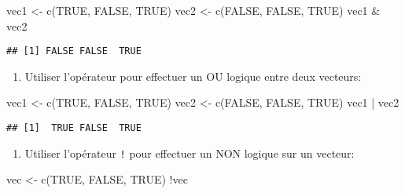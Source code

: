 \documentclass[
]{article}
\newenvironment{Shaded}{\begin{snugshade}}{\end{snugshade}}
\newcommand{\ConstantTok}[1]{\textcolor[rgb]{0.00,0.00,0.00}{#1}}
\newcommand{\FunctionTok}[1]{\textcolor[rgb]{0.00,0.00,0.00}{#1}}
\newcommand{\NormalTok}[1]{#1}
\newcommand{\OtherTok}[1]{\textcolor[rgb]{0.56,0.35,0.01}{#1}}
\newcommand{\SpecialCharTok}[1]{\textcolor[rgb]{0.00,0.00,0.00}{#1}}
\providecommand{\tightlist}{%
  \setlength{\itemsep}{0pt}\setlength{\parskip}{0pt}}
\begin{document}
\begin{Shaded}
\begin{Highlighting}[]
\NormalTok{vec1 }\OtherTok{\textless{}{-}} \FunctionTok{c}\NormalTok{(}\ConstantTok{TRUE}\NormalTok{, }\ConstantTok{FALSE}\NormalTok{, }\ConstantTok{TRUE}\NormalTok{)}
\NormalTok{vec2  }\OtherTok{\textless{}{-}} \FunctionTok{c}\NormalTok{(}\ConstantTok{FALSE}\NormalTok{, }\ConstantTok{FALSE}\NormalTok{, }\ConstantTok{TRUE}\NormalTok{)}
\NormalTok{vec1 }\SpecialCharTok{\&}\NormalTok{ vec2}
\end{Highlighting}
\end{Shaded}

\begin{verbatim}
## [1] FALSE FALSE  TRUE
\end{verbatim}

\begin{enumerate}
\def\labelenumi{\arabic{enumi}.}
\setcounter{enumi}{4}
\tightlist
\item
  Utiliser l'opérateur \texttt{\textbar{}} pour effectuer un OU logique entre deux vecteurs:
\end{enumerate}

\begin{Shaded}
\begin{Highlighting}[]
\NormalTok{vec1 }\OtherTok{\textless{}{-}} \FunctionTok{c}\NormalTok{(}\ConstantTok{TRUE}\NormalTok{, }\ConstantTok{FALSE}\NormalTok{, }\ConstantTok{TRUE}\NormalTok{)}
\NormalTok{vec2  }\OtherTok{\textless{}{-}} \FunctionTok{c}\NormalTok{(}\ConstantTok{FALSE}\NormalTok{, }\ConstantTok{FALSE}\NormalTok{, }\ConstantTok{TRUE}\NormalTok{)}
\NormalTok{vec1 }\SpecialCharTok{|}\NormalTok{ vec2}
\end{Highlighting}
\end{Shaded}

\begin{verbatim}
## [1]  TRUE FALSE  TRUE
\end{verbatim}

\begin{enumerate}
\def\labelenumi{\arabic{enumi}.}
\setcounter{enumi}{5}
\tightlist
\item
  Utiliser l'opérateur \texttt{!} pour effectuer un NON logique sur un vecteur:
\end{enumerate}

\begin{Shaded}
\begin{Highlighting}[]
\NormalTok{vec }\OtherTok{\textless{}{-}} \FunctionTok{c}\NormalTok{(}\ConstantTok{TRUE}\NormalTok{, }\ConstantTok{FALSE}\NormalTok{, }\ConstantTok{TRUE}\NormalTok{)}
\SpecialCharTok{!}\NormalTok{vec}
\end{Highlighting}
\end{Shaded}
\end{document}
